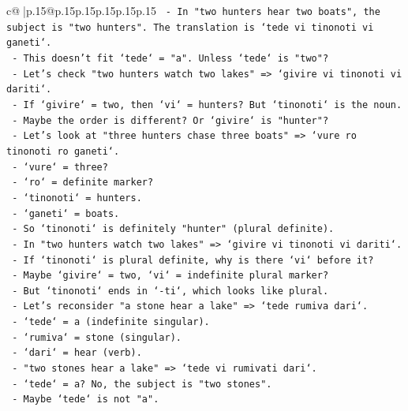 \documentclass{article}
\begin{document}
{\begin{supertabular}{c@{$\;$}|p{.15\linewidth}@{}p{.15\linewidth}p{.15\linewidth}p{.15\linewidth}p{.15\linewidth}p{.15\linewidth}}
{{{\texttt{             {-} In "two hunters hear two boats", the subject is "two hunters". The translation is `tede vi tinonoti vi ganeti`.} \\
\texttt{             {-} This doesn't fit `tede` = "a". Unless `tede` is "two"?} \\
\texttt{             {-} Let's check "two hunters watch two lakes" => `givire vi tinonoti vi dariti`.} \\
\texttt{             {-} If `givire` = two, then `vi` = hunters? But `tinonoti` is the noun.} \\
\texttt{             {-} Maybe the order is different? Or `givire` is "hunter"?} \\
\texttt{             {-} Let's look at "three hunters chase three boats" => `vure ro tinonoti ro ganeti`.} \\
\texttt{               {-} `vure` = three?} \\
\texttt{               {-} `ro` = definite marker?} \\
\texttt{               {-} `tinonoti` = hunters.} \\
\texttt{               {-} `ganeti` = boats.} \\
\texttt{             {-} So `tinonoti` is definitely "hunter" (plural definite).} \\
\texttt{             {-} In "two hunters watch two lakes" => `givire vi tinonoti vi dariti`.} \\
\texttt{               {-} If `tinonoti` is plural definite, why is there `vi` before it?} \\
\texttt{               {-} Maybe `givire` = two, `vi` = indefinite plural marker?} \\
\texttt{               {-} But `tinonoti` ends in `{-}ti`, which looks like plural.} \\
\texttt{               {-} Let's reconsider "a stone hear a lake" => `tede rumiva dari`.} \\
\texttt{                 {-} `tede` = a (indefinite singular).} \\
\texttt{                 {-} `rumiva` = stone (singular).} \\
\texttt{                 {-} `dari` = hear (verb).} \\
\texttt{               {-} "two stones hear a lake" => `tede vi rumivati dari`.} \\
\texttt{                 {-} `tede` = a? No, the subject is "two stones".} \\
\texttt{                 {-} Maybe `tede` is not "a".} \\
}}}
\end{supertabular}}
\end{document}
